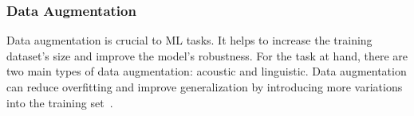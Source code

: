 \subsubsection{Data Augmentation} \label{sec:data-augmentation}

Data augmentation is crucial to \ac{ML} tasks. It helps to increase the training dataset's size and improve the model's robustness. For the task at hand, there are two main types of data augmentation: acoustic and linguistic. Data augmentation can reduce overfitting and improve generalization by introducing more variations into the training set~\cite{pluscec_data_2023}.


